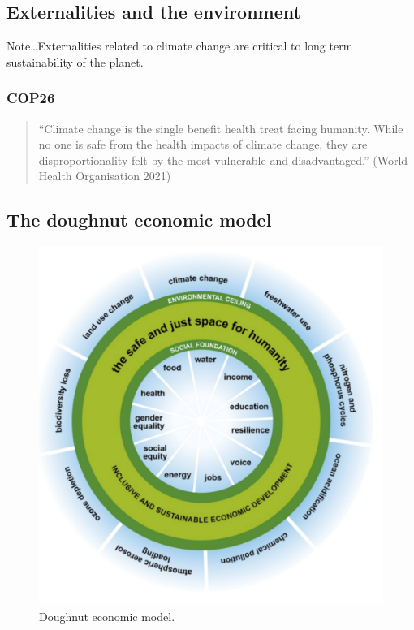 \documentclass[class=report, crop=false, 12pt,a4paper]{standalone}
\begin{document}
\subsection{Externalities and the environment}
Note\dots Externalities related to climate change are critical to long term sustainability of the planet.
\subsubsection{COP26}
\begin{quote}
	``Climate change is the single benefit health treat facing humanity. While no one is safe from the health impacts of climate change, they are disproportionality felt by the most vulnerable and disadvantaged.'' (World Health Organisation 2021)
\end{quote}
\subsection{The doughnut economic model}
\begin{figure}[H]
	\centering
	\includegraphics[width = \textwidth]{../img/figure20.png}
	\caption{Doughnut economic model.}
\end{figure}
\end{document}
